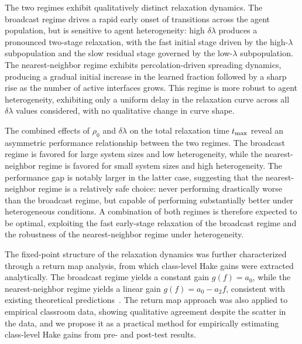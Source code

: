 \documentclass[a4paper,fleqn]{cas-sc}
\begin{document}
The two regimes exhibit qualitatively distinct relaxation dynamics.
The broadcast regime drives a rapid early onset of transitions across the agent population, but is sensitive to agent heterogeneity: high $\delta\lambda$ produces a pronounced two-stage relaxation, with the fast initial stage driven by the high-$\lambda$ subpopulation and the slow residual stage governed by the low-$\lambda$ subpopulation.
The nearest-neighbor regime exhibits percolation-driven spreading dynamics, producing a gradual initial increase in the learned fraction followed by a sharp rise as the number of active interfaces grows.
This regime is more robust to agent heterogeneity, exhibiting only a uniform delay in the relaxation curve across all $\delta\lambda$ values considered, with no qualitative change in curve shape.

The combined effects of $\rho_0$ and $\delta\lambda$ on the total relaxation time $t_{\rm max}$ reveal an asymmetric performance relationship between the two regimes.
The broadcast regime is favored for large system sizes and low heterogeneity, while the nearest-neighbor regime is favored for small system sizes and high heterogeneity.
The performance gap is notably larger in the latter case, suggesting that the nearest-neighbor regime is a relatively safe choice: never performing drastically worse than the broadcast regime, but capable of performing substantially better under heterogeneous conditions.
A combination of both regimes is therefore expected to be optimal, exploiting the fast early-stage relaxation of the broadcast regime and the robustness of the nearest-neighbor regime under heterogeneity.

The fixed-point structure of the relaxation dynamics was further characterized through a return map analysis, from which class-level Hake gains were extracted analytically.
The broadcast regime yields a constant gain $g(f)=a_0$, while the nearest-neighbor regime yields a linear gain $g(f)=a_0-a_2f$, consistent with existing theoretical predictions~\citep{nitta2019mathematical}.
The return map approach was also applied to empirical classroom data, showing qualitative agreement despite the scatter in the data, and we propose it as a practical method for empirically estimating class-level Hake gains from pre- and post-test results.
\end{document}
